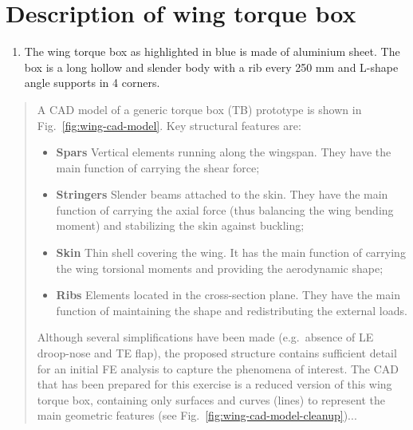\documentclass[11pt,a4paper,oneside]{memoir}
\begin{document}
\section{Description of wing torque box}

\begin{enumerate}
	\item The wing torque box as highlighted in blue is made of aluminium sheet. The box is a long hollow and slender body with a rib every 250 mm and L-shape angle supports in 4 corners.  
\end{enumerate}
%

\begin{quote} A CAD model of a generic torque box (TB) prototype is shown in Fig.~\ref{fig:wing-cad-model}. Key structural features are: 

\begin{itemize}
\item \textbf{Spars} Vertical elements running along the wingspan. They have the main function of carrying the shear force; 
\item \textbf{Stringers} Slender beams attached to the skin. They have the main function of carrying the axial force (thus balancing the wing bending moment) and stabilizing the skin against buckling; 
\item \textbf{Skin} Thin shell covering the wing. It has the main function of carrying the wing torsional moments and providing the aerodynamic shape; 
\item \textbf{Ribs} Elements located in the cross-section plane. They have the main function of maintaining the shape and redistributing the external loads.
\end{itemize}
%
Although several simplifications have been made (e.g.~absence of LE droop-nose and TE flap), the proposed structure contains sufficient detail for an initial FE analysis to capture the phenomena of interest. The CAD that has been prepared for this exercise is a reduced version of this wing torque box, containing only surfaces and curves (lines) to represent the main geometric features (see Fig.~\ref{fig:wing-cad-model-cleanup})...\end{quote}
%
\end{document}
